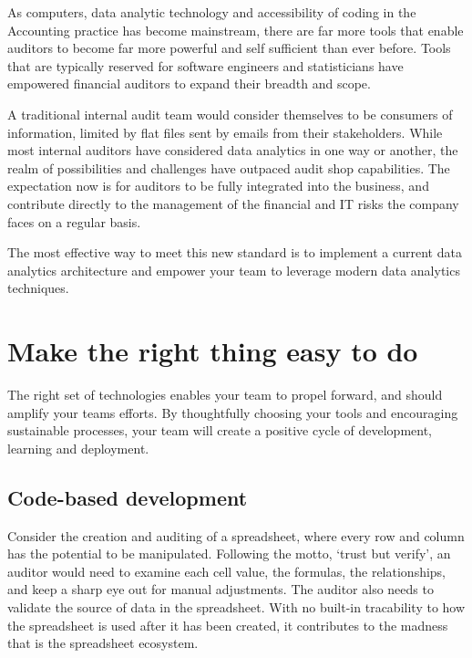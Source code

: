 \documentclass[
]{book}
\begin{document}
As computers, data analytic technology and accessibility of coding in the Accounting practice has become mainstream, there are far more tools that enable auditors to become far more powerful and self sufficient than ever before. Tools that are typically reserved for software engineers and statisticians have empowered financial auditors to expand their breadth and scope.

A traditional internal audit team would consider themselves to be consumers of information, limited by flat files sent by emails from their stakeholders. While most internal auditors have considered data analytics in one way or another, the realm of possibilities and challenges have outpaced audit shop capabilities. The expectation now is for auditors to be fully integrated into the business, and contribute directly to the management of the financial and IT risks the company faces on a regular basis.

The most effective way to meet this new standard is to implement a current data analytics architecture and empower your team to leverage modern data analytics techniques.

\hypertarget{make-the-right-thing-easy-to-do}{%
\section{Make the right thing easy to do}\label{make-the-right-thing-easy-to-do}}

The right set of technologies enables your team to propel forward, and should amplify your teams efforts. By thoughtfully choosing your tools and encouraging sustainable processes, your team will create a positive cycle of development, learning and deployment.

\hypertarget{code-based-development}{%
\subsection{Code-based development}\label{code-based-development}}

Consider the creation and auditing of a spreadsheet, where every row and column has the potential to be manipulated. Following the motto, `trust but verify', an auditor would need to examine each cell value, the formulas, the relationships, and keep a sharp eye out for manual adjustments. The auditor also needs to validate the source of data in the spreadsheet. With no built-in tracability to how the spreadsheet is used after it has been created, it contributes to the madness that is the spreadsheet ecosystem.
\end{document}
